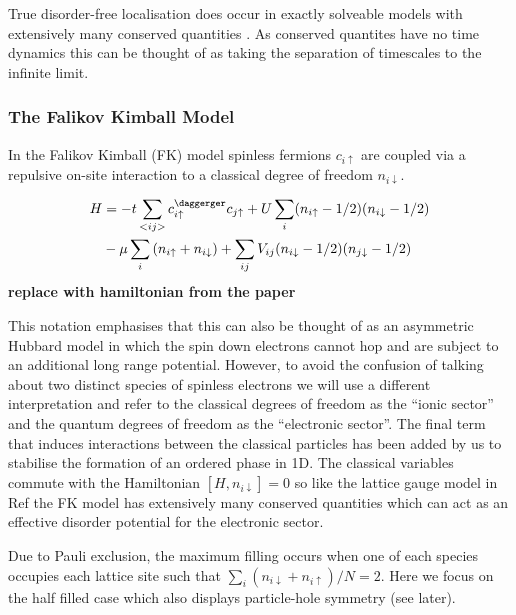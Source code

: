 True disorder-free localisation does occur in exactly solveable models with extensively many conserved quantities \autocite{smithDisorderFreeLocalization2017}. As conserved quantites have no time dynamics this can be thought of as taking the separation of timescales to the infinite limit.

\hypertarget{the-falikov-kimball-model}{%
\subsubsection{The Falikov Kimball Model}\label{the-falikov-kimball-model}}

In the Falikov Kimball (FK) model spinless fermions \(c_{i\uparrow}\) are coupled via a repulsive on-site interaction to a classical degree of freedom \(n_{i\downarrow}\).

\[\begin{aligned}
H &= -t \sum_{<ij>} c^\daggerger_{i\uparrow}c_{j\uparrow} + U \sum_{i} (n_{i \uparrow} - 1/2)( n_{i\downarrow} - 1/2) \\
       & - \mu \sum_i \left( n_{i \uparrow} + n_{i \downarrow} \right) + \sum_{ij} V_{ij} (n_{i\downarrow} - 1/2)(n_{j\downarrow} - 1/2) 
\end{aligned}\] \textbf{replace with hamiltonian from the paper}

This notation emphasises that this can also be thought of as an asymmetric Hubbard model in which the spin down electrons cannot hop and are subject to an additional long range potential. However, to avoid the confusion of talking about two distinct species of spinless electrons we will use a different interpretation and refer to the classical degrees of freedom as the ``ionic sector'' and the quantum degrees of freedom as the ``electronic sector''. The final term that induces interactions between the classical particles has been added by us to stabilise the formation of an ordered phase in 1D. The classical variables commute with the Hamiltonian \([H, n_{i\downarrow}] = 0\) so like the lattice gauge model in Ref \autocite{smithDisorderFreeLocalization2017} the FK model has extensively many conserved quantities which can act as an effective disorder potential for the electronic sector.

Due to Pauli exclusion, the maximum filling occurs when one of each species occupies each lattice site such that \(\sum_i (n_{i\downarrow} + n_{i\uparrow} )/ N = 2\). Here we focus on the half filled case which also displays particle-hole symmetry (see later).

